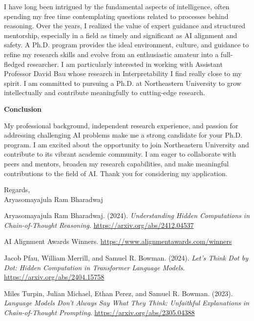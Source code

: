 \documentclass[12pt]{article}
\begin{document}
I have long been intrigued by the fundamental aspects of intelligence, often spending my free time contemplating questions related to  processes behind reasoning. Over the years, I realized the value of expert guidance and structured mentorship, especially in a field as timely and significant as AI alignment and safety. A Ph.D. program provides the ideal environment, culture, and guidance to refine my research skills and evolve from an enthusiastic amateur into a full-fledged researcher. I am particularly interested in working with Assistant Professor David Bau whose research in Interpretability I find really close to my spirit. I am committed to pursuing a Ph.D. at Northeastern University to grow intellectually and contribute meaningfully to cutting-edge research.


\textbf{Conclusion}

My professional background, independent research experience, and passion for addressing challenging AI problems make me a strong candidate for your Ph.D. program. I am excited about the opportunity to join
Northeastern University and contribute to its vibrant academic community. I am eager to collaborate with peers and mentors, broaden my research capabilities, and make meaningful contributions to the field of AI. Thank you for considering my application.

Regards,\\
Aryasomayajula Ram Bharadwaj

\newpage
\begin{thebibliography}{9}

Aryasomayajula Ram Bharadwaj. (2024). \emph{Understanding Hidden Computations in Chain-of-Thought Reasoning}.  
\url{https://arxiv.org/abs/2412.04537}

AI Alignment Awards Winners.  
\url{https://www.alignmentawards.com/winners}

Jacob Pfau, William Merrill, and Samuel R. Bowman. (2024). \emph{Let's Think Dot by Dot: Hidden Computation in Transformer Language Models}.  
\url{https://arxiv.org/abs/2404.15758}

Miles Turpin, Julian Michael, Ethan Perez, and Samuel R. Bowman. (2023). \emph{Language Models Don't Always Say What They Think: Unfaithful Explanations in Chain-of-Thought Prompting}.  
\url{https://arxiv.org/abs/2305.04388}

\end{thebibliography}
\end{document}
